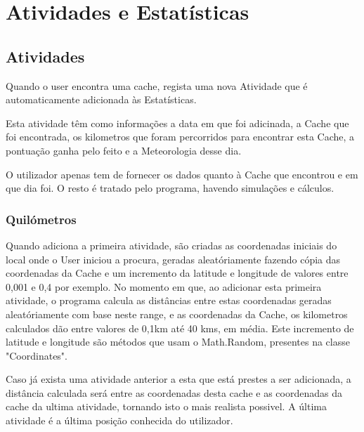 \documentclass{article}
\begin{document}
\pagebreak
\section{Atividades e Estatísticas}

\subsection{Atividades}
\quad Quando o user encontra uma cache, regista uma nova Atividade que é automaticamente adicionada às Estatísticas.
\par Esta atividade têm como informações a data em que foi adicinada, a Cache que foi encontrada, os kilometros que foram percorridos para encontrar esta Cache, a pontuação ganha pelo feito e a Meteorologia desse dia.
\par O utilizador apenas tem de fornecer os dados quanto à Cache que encontrou e em que dia foi. O resto é tratado pelo programa, havendo simulações e cálculos.

\subsubsection{Quilómetros}
\quad  Quando adiciona a primeira atividade, são criadas as coordenadas iniciais do local onde o User iniciou a procura, geradas aleatóriamente fazendo cópia das coordenadas da Cache e um incremento da latitude e longitude de valores entre 0,001 e 0,4 por exemplo. No momento em que, ao adicionar esta primeira atividade, o programa calcula as distâncias entre estas coordenadas geradas aleatóriamente com base neste range, e as coordenadas da Cache, os kilometros calculados dão entre valores de 0,1km até 40 kms, em média.
Este incremento de latitude e longitude são métodos que usam o Math.Random, presentes na classe "Coordinates".
\par Caso já exista uma atividade anterior a esta que está prestes a ser adicionada, a distância calculada será entre as coordenadas desta cache e as coordenadas da cache da ultima atividade, tornando isto o mais realista possivel. A última atividade é a última posição conhecida do utilizador.
\\
\end{document}
